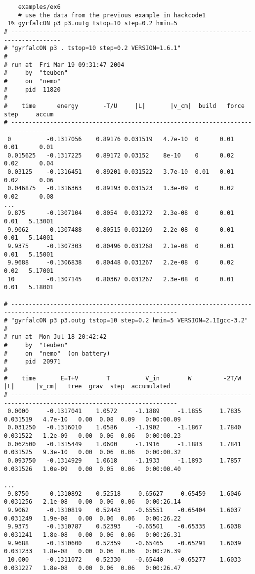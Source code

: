 \footnotesize\begin{verbatim}
    examples/ex6
    # use the data from the previous example in hackcode1
 1% gyrfalcON p3 p3.outg tstop=10 step=0.2 hmin=5
# ------------------------------------------------------------------------------------
# "gyrfalcON p3 . tstop=10 step=0.2 VERSION=1.6.1"
#
# run at  Fri Mar 19 09:31:47 2004
#     by  "teuben"
#     on  "nemo"
#     pid  11820
#
#    time      energy       -T/U     |L|       |v_cm|  build   force    step     accum
# ------------------------------------------------------------------------------------
 0          -0.1317056    0.89176 0.031519   4.7e-10  0      0.01       0.01      0.01
 0.015625   -0.1317225    0.89172 0.03152    8e-10    0      0.02       0.02      0.04
 0.03125    -0.1316451    0.89201 0.031522   3.7e-10  0.01   0.01       0.02      0.06
 0.046875   -0.1316363    0.89193 0.031523   1.3e-09  0      0.02       0.02      0.08
...
 9.875      -0.1307104    0.8054  0.031272   2.3e-08  0      0.01       0.01   5.13001
 9.9062     -0.1307488    0.80515 0.031269   2.2e-08  0      0.01       0.01   5.14001
 9.9375     -0.1307303    0.80496 0.031268   2.1e-08  0      0.01       0.01   5.15001
 9.9688     -0.1306838    0.80448 0.031267   2.2e-08  0      0.02       0.02   5.17001
 10         -0.1307145    0.80367 0.031267   2.3e-08  0      0.01       0.01   5.18001

# ---------------------------------------------------------------------------------------------------------------------
# "gyrfalcON p3 p3.outg tstop=10 step=0.2 hmin=5 VERSION=2.1Igcc-3.2"
#
# run at  Mon Jul 18 20:42:42
#     by  "teuben"
#     on  "nemo"  (on battery)
#     pid  20971
#
#    time       E=T+V        T          V_in        W         -2T/W     |L|      |v_cm|   tree  grav  step  accumulated
# ---------------------------------------------------------------------------------------------------------------------
 0.0000     -0.1317041    1.0572     -1.1889     -1.1855     1.7835  0.031519   4.7e-10   0.00  0.08  0.09   0:00:00.09
 0.031250   -0.1316010    1.0586     -1.1902     -1.1867     1.7840  0.031522   1.2e-09   0.00  0.06  0.06   0:00:00.23
 0.062500   -0.1315449    1.0600     -1.1916     -1.1883     1.7841  0.031525   9.3e-10   0.00  0.06  0.06   0:00:00.32
 0.093750   -0.1314929    1.0618     -1.1933     -1.1893     1.7857  0.031526   1.0e-09   0.00  0.05  0.06   0:00:00.40

...
 9.8750     -0.1310892    0.52518    -0.65627    -0.65459    1.6046  0.031256   2.1e-08   0.00  0.06  0.06   0:00:26.14
 9.9062     -0.1310819    0.52443    -0.65551    -0.65404    1.6037  0.031249   1.9e-08   0.00  0.06  0.06   0:00:26.22
 9.9375     -0.1310787    0.52393    -0.65501    -0.65335    1.6038  0.031241   1.8e-08   0.00  0.06  0.06   0:00:26.31
 9.9688     -0.1310600    0.52359    -0.65465    -0.65291    1.6039  0.031233   1.8e-08   0.00  0.06  0.06   0:00:26.39
 10.000     -0.1311072    0.52330    -0.65440    -0.65277    1.6033  0.031227   1.8e-08   0.00  0.06  0.06   0:00:26.47

\end{verbatim}\normalsize

